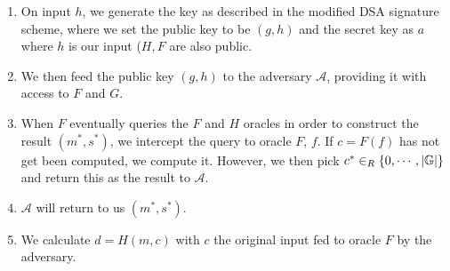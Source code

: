 \documentclass{article}
\begin{document}
\begin{enumerate}
\begin{itemize}
\begin{mdbmarginx}{1ex}{0pt}{1ex}{0pt}
\begin{enumerate}[noitemsep,topsep=\mdcompacttopsep]
\item{}On input $h$, we generate the key as described in the modified DSA signature scheme, where
we set the public key to be $(g,h)$ and the secret key as $a$ where $h$ is our input ($H,F$ are 
also public.%

\item{}We then feed the public key $(g,h)$ to the adversary $\mathcal{A}$, providing it with access 
to $F$ and $G$.%

\item{}When $F$ eventually queries the $F$ and $H$ oracles in order to construct the result
$(m^*, s^*)$, we intercept the query to oracle $F$, $f$. If $c = F(f)$ has not get been computed,
we compute it. However, we then pick $c^* \in_R \{0, \cdots, |\mathbb{G}|\}$ and return this as the
result to $\mathcal{A}$.%

\item{}$\mathcal{A}$ will return to us $(m^*,s^*)$.%

\item{}We calculate $d = H(m,c)$ with $c$ the original input fed to oracle $F$ by the adversary.%


\end{enumerate}
\end{mdbmarginx}
\end{itemize}
\end{enumerate}
\end{document}

